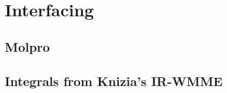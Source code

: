 \hypertarget{chap:interfacing}{}
\chapter{Interfacing}
\label{sec:interfacing}
\chapterauthor{}



\section{Molpro}


\section{Integrals from Knizia's IR-WMME}
\label{sec:irwmme}




